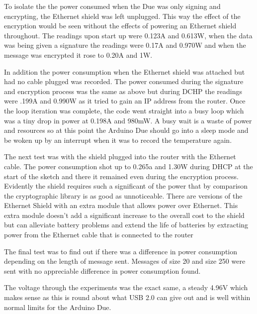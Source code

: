 To isolate the the power consumed when the Due was only signing and encrypting, the Ethernet shield was left unplugged. This way the effect of the encryption would be seen without the effects of powering an Ethernet shield throughout. 
The readings upon start up were 0.123A and 0.613W, when the data was being given a signature the readings were 0.17A and 0.970W and when the message was encrypted it rose to 0.20A and 1W. 

In addition the power consumption when the Ethernet shield was attached but had no cable plugged was recorded. The power consumed during the signature and encryption process was the same as above but during DCHP the readings were .199A and 0.990W as it tried to gain an IP address from the router. Once the loop iteration was complete, the code went straight into a busy loop which was a tiny drop in power at 0.198A and 980mW. A busy wait is a waste of power and resources so at this point the Arduino Due should go into a sleep mode and be woken up by an interrupt when it was to record the temperature again. 

The next test was with the shield plugged into the router with the Ethernet cable. The power consumption shot up to 0.265a and 1.30W during DHCP at the start of the sketch and there it remained even during the encryption process. Evidently the shield requires such a significant of the power that by comparison the cryptographic library is as good as unnoticeable. There are versions of the Ethernet Shield with an extra module that allows power over Ethernet. This extra module doesn't add a significant increase to the overall cost to the shield but can alleviate battery problems and extend the life of batteries by extracting power from the Ethernet cable that is connected to the router

The final test was to find out if there was a difference in power consumption depending on the length of message sent. Messages of size 20 and size 250 were sent with no appreciable difference in power consumption found.


The voltage through the experiments was the exact same, a steady 4.96V which makes sense as this is round about what USB 2.0 can give out and is well within normal limits for the Arduino Due.




